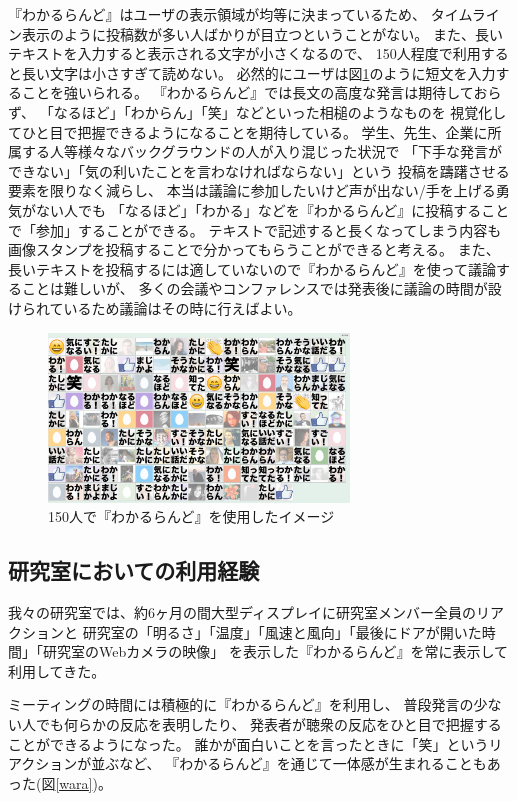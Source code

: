 『わかるらんど』はユーザの表示領域が均等に決まっているため、
タイムライン表示のように投稿数が多い人ばかりが目立つということがない。
また、長いテキストを入力すると表示される文字が小さくなるので、
150人程度で利用すると長い文字は小さすぎて読めない。
必然的にユーザは図\ref{wakaruland150}のように短文を入力することを強いられる。
『わかるらんど』では長文の高度な発言は期待しておらず、
「なるほど」「わからん」「笑」などといった相槌のようなものを
視覚化してひと目で把握できるようになることを期待している。
学生、先生、企業に所属する人等様々なバックグラウンドの人が入り混じった状況で
「下手な発言ができない」「気の利いたことを言わなければならない」という
投稿を躊躇させる要素を限りなく減らし、
本当は議論に参加したいけど声が出ない/手を上げる勇気がない人でも
「なるほど」「わかる」などを『わかるらんど』に投稿することで「参加」することができる。
テキストで記述すると長くなってしまう内容も
画像スタンプを投稿することで分かってもらうことができると考える。
また、長いテキストを投稿するには適していないので『わかるらんど』を使って議論することは難しいが、
多くの会議やコンファレンスでは発表後に議論の時間が設けられているため議論はその時に行えばよい。

\begin{figure}[h]
\centering
\includegraphics[width=8cm]{images/wakaruland150.png}
\caption{150人で『わかるらんど』を使用したイメージ}
\label{wakaruland150}
\end{figure}

\subsection{研究室においての利用経験}
我々の研究室では、約6ヶ月の間大型ディスプレイに研究室メンバー全員のリアクションと
研究室の「明るさ」「温度」「風速と風向」「最後にドアが開いた時間」「研究室のWebカメラの映像」
を表示した『わかるらんど』を常に表示して利用してきた。

ミーティングの時間には積極的に『わかるらんど』を利用し、
普段発言の少ない人でも何らかの反応を表明したり、
発表者が聴衆の反応をひと目で把握することができるようになった。
誰かが面白いことを言ったときに「笑」というリアクションが並ぶなど、
『わかるらんど』を通じて一体感が生まれることもあった(図\ref{wara})。

